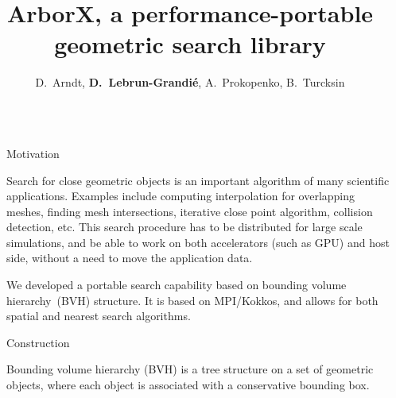 \documentclass[final,hyperref={pdfpagelabels=false}]{beamer}
\title{\huge ArborX, a performance-portable geometric search library}
\author{D.~Arndt, \textbf{D.~Lebrun-Grandi{\'e}}, A.~Prokopenko, B.~Turcksin}
\institute{Oak Ridge National Laboratory}
\begin{document}

\begin{frame}[t,fragile]

\begin{columns}[t]

\begin{column}{.02\textwidth}\end{column}

\begin{column}{.450\textwidth}

\begin{block}{\centering Motivation}

  Search for close geometric objects is an important algorithm of many
  scientific applications.
  Examples include computing interpolation for overlapping meshes, finding
  mesh intersections, iterative close point algorithm, collision detection, etc.
  This search procedure has to be distributed for large scale simulations, and
  be able to work on both accelerators (such as GPU) and host side, without a
  need to move the application data.

  We developed a portable search capability based on bounding volume
  hierarchy~(BVH) structure. It is based on MPI/Kokkos, and allows for both
  spatial and nearest search algorithms.
\end{block}

\begin{block}{\centering Construction}

  Bounding volume hierarchy (BVH) is a tree structure on a set of geometric
  objects, where each object is associated with a conservative bounding box.


\end{block}
\end{column}
\end{columns}
\end{frame}
\end{document}
